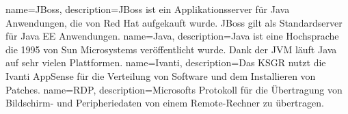 
\makenoidxglossaries
{}
{
        name=JBoss,
        description={JBoss ist ein Applikationsserver für \Gls{Java} Anwendungen, die von Red Hat aufgekauft wurde.
        JBoss gilt als Standardserver für Java EE Anwendungen\cite{U4ZJDNI2}.}
}
{
        name=Java,
        description={Java ist eine Hochsprache die 1995 von Sun Microsystems veröffentlicht wurde.
Dank der JVM läuft Java auf sehr vielen Plattformen\cite{6H25Z3UI}.}
}
{
        name=Ivanti,
        description={Das KSGR nutzt die Ivanti AppSense\cite{LPHK6T9X, 8CHLH32N} für die Verteilung von Software und dem Installieren von Patches.}
}
{
        name=RDP,
        description={Microsofts Protokoll für die Übertragung von Bildschirm- und Peripheriedaten von einem Remote-Rechner zu übertragen\cite{9PJHPCRS}.}
}
